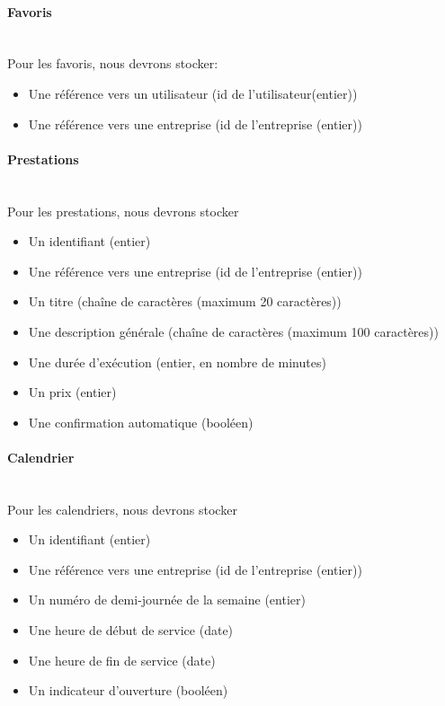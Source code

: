 \documentclass{article}
\begin{document}
\paragraph{Favoris}
~~\\
Pour les favoris, nous devrons stocker:
\begin{itemize}
\item Une référence vers un utilisateur (id de l'utilisateur(entier))
\item Une référence vers une entreprise (id de l'entreprise (entier))
\end{itemize}

\paragraph{Prestations}
~~\\
Pour les prestations, nous devrons stocker
\begin{itemize}
\item Un identifiant (entier)
\item Une référence vers une entreprise (id de l'entreprise (entier))
\item Un titre (chaîne de caractères (maximum 20 caractères))
\item Une description générale (chaîne de caractères (maximum 100 caractères))
\item Une durée d'exécution (entier, en nombre de minutes)
\item Un prix (entier)
\item Une confirmation automatique (booléen)
\end{itemize}

\paragraph{Calendrier}
~~\\
Pour les calendriers, nous devrons stocker
\begin{itemize}
\item Un identifiant (entier)
\item Une référence vers une entreprise (id de l'entreprise (entier))
\item Un numéro de demi-journée de la semaine (entier)
\item Une heure de début de service (date)
\item Une heure de fin de service (date)
\item Un indicateur d'ouverture (booléen)
\end{itemize}
\end{document}
